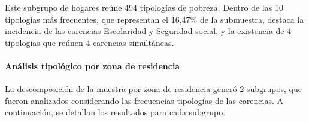 \documentclass[12pt,letterpaper,spanish]{article}
\begin{document}
\begin{itemize}
    Este subgrupo de hogares reúne 494 tipologías de pobreza. Dentro de las 10 tipologías más frecuentes, que representan el 16,47\% de la submuestra, destaca la incidencia de las carencias Escolaridad y Seguridad social, y la existencia de 4 tipologías que reúnen 4 carencias simultáneas.

\end{itemize}

\paragraph{Análisis tipológico por zona de residencia}
La descomposición de la muestra por zona de residencia generó 2 subgrupos, que fueron analizados considerando las frecuencias tipologías de las carencias. A continuación, se detallan los resultados para cada subgrupo.
\end{document}
